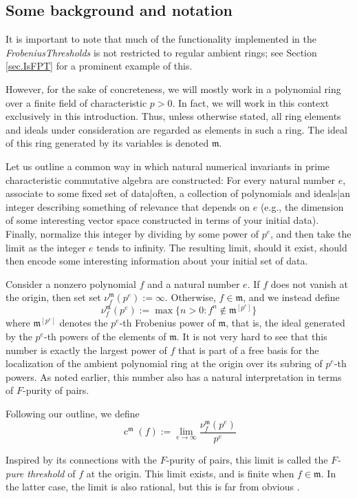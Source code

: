 \documentclass{amsart}
\newcommand{\ft}{\operatorname{c}}
\newcommand{\idealm}{\mathfrak{m}}
\begin{document}
\subsection*{Some background and notation}  
It is important to note that much of the functionality implemented in the \emph{FrobeniusThresholds} is not restricted to regular ambient rings; see Section \ref{sec.IsFPT} for a prominent example of this.

However, for the sake of concreteness, we will mostly work in a polynomial ring over a finite field of  characteristic $p>0$.  In fact,  we will work in this context exclusively in this introduction.  Thus, unless otherwise stated, all ring elements and ideals under consideration are regarded as elements in such a ring.  The ideal of this ring generated by its variables is denoted $\idealm$.

Let us outline a common way in which natural numerical invariants in prime characteristic commutative algebra are constructed:  For every natural number $e$, associate to some fixed set of data|often, a collection of polynomials and ideals|an integer describing something of relevance that depends on $e$ (e.g., the dimension of some interesting vector space constructed in terms of your initial data).   Finally, normalize this integer by dividing by some power of $p^e$, and then take the limit as the integer $e$ tends to infinity.  The resulting limit, should it exist, should then encode some interesting information about your initial set of data.

Consider a nonzero polynomial $f$ and a natural number $e$.  If $f$ does not vanish at the origin, then set set $\nu_f^{\idealm}(p^e) := \infty$.  Otherwise, $f \in \idealm$, and we instead define
\[ \nu_f^{\idealm}(p^e) := \max \{ n>0 : f^n \notin \idealm^{[p^e]} \} \] 
where $\idealm^{[p^e]}$ denotes the $p^e$-th Frobenius power of $\idealm$, that is, the ideal generated by the $p^e$-th powers of the elements of $\idealm$.    It is not very hard to see that this number is exactly the largest power of $f$ that is part of a free basis for the localization of the ambient polynomial ring at the origin over its subring of $p^e$-th powers.  As noted earlier, this number also has a natural interpretation in terms of $F$-purity of pairs.   

Following our outline, we define 
\[ \ft^{\idealm}(f) := \lim_{e \to \infty} \frac{ \nu_f^{\idealm}(p^e)}{p^e} \]

Inspired by its connections with the $F$-purity of pairs,  this limit is called the \emph{$F$-pure threshold} of $f$ at the origin.  This limit exists, and is finite when $f \in \idealm$.  In the latter case, the limit is also rational, but this is far from obvious  \cite{BlickleMustataSmithDiscretenessAndRationalityOfFThresholds}.
\end{document}

